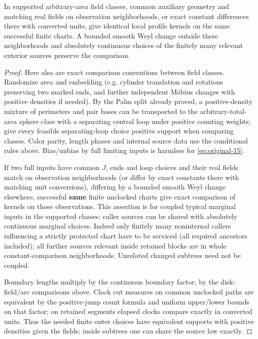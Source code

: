 \begin{lemma}\label{kern:field-comparison}
In supported arbitrary-area field classes, common auxiliary geometry and matching real fields
on observation neighborhoods, or exact constant differences there with converted units, give
identical local profile kernels on the same successful finite charts. A bounded smooth Weyl
change outside these neighborhoods and absolutely continuous choices of the finitely many
relevant exterior sources preserve the comparison.
\end{lemma}
\begin{proof}

Here also are exact comparison conventions between field classes. Randomize area and embedding (e.g.
cylinder translation and rotations preserving two marked ends, and further independent Möbius changes with
positive densities if needed). By the Palm split already proved, a positive-density mixture of perimeters
and pair bases can be transported to the arbitrary-total-area sphere class with a separating central loop
under positive counting weights; give every feasible separating-loop choice positive support when comparing
classes. Color parity, length phases and internal source data use the conditional rules above. Bias/unbias
by full limiting inputs is harmless for \eqref{eq:original-15}.

If two full inputs have common \(J\), ends
and loop choices and their real fields match on observation neighborhoods (or differ by exact constants
there with matching unit conversions), differing by a bounded smooth Weyl change elsewhere, successful
\textbf{same} finite unclocked charts give exact comparison of kernels on those observations. This assertion
is for coupled typical marginal inputs in the supported classes: caller sources can be shared with
absolutely continuous marginal choices. Indeed only finitely many noninternal callers influencing a strictly
protected chart have to be serviced (all required ancestors included); all further sources relevant inside
retained blocks are in whole constant-comparison neighborhoods. Unrelated changed subtrees need not be
coupled.

Boundary lengths multiply by the continuous boundary factor, by the disk-field/arc comparisons
above. Clock cut measures on common unclocked paths are equivalent by the positive-jump count formula and
uniform upper/lower bounds on that factor; on retained segments elapsed clocks compare exactly in converted
units. Thus the needed finite outer choices have equivalent supports with positive densities given the
fields; inside subtrees one can share the source law exactly.


\end{proof}
